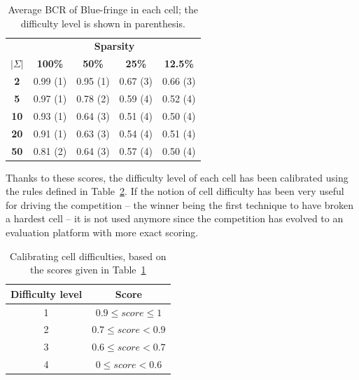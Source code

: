 \begin{table}
\begin{center}
\begin{tabular}{c|c c c c}
&\multicolumn{4}{|c}{\textbf{Sparsity}}\\ 
\textbf{$|\Sigma|$} & \textbf{100\%} & \textbf{50\%} & \textbf{25\%} & \textbf{12.5\%}\\
\hline
\textbf{2}  & 0.99 (1) & 0.95 (1) & 0.67 (3) & 0.66 (3)\\
\textbf{5}  & 0.97 (1) & 0.78 (2) & 0.59 (4) & 0.52 (4)\\
\textbf{10} & 0.93 (1) & 0.64 (3) & 0.51 (4) & 0.50 (4)\\
\textbf{20} & 0.91 (1) & 0.63 (3) & 0.54 (4) & 0.51 (4)\\
\textbf{50} & 0.81 (2) & 0.64 (3) & 0.57 (4) & 0.50 (4)\\
\end{tabular}
\end{center}
\caption{Average BCR of Blue-fringe in each cell; the difficulty level is shown in parenthesis.\label{table:stamina-baseline}}
\end{table}

Thanks to these scores, the difficulty level of each cell has been calibrated using the rules defined in Table~\ref{stamina:table:calibration}. If the notion of cell difficulty has been very useful for driving the competition -- the winner being the first technique to have broken a hardest cell -- it is not used anymore since the competition has evolved to an evaluation platform with more exact scoring.

\begin{table}
\begin{center}
\begin{tabular}{c|c}
Difficulty level & Score\\
\hline
1&$0.9 \leq score \leq 1$\\
2&$0.7 \leq score < 0.9$\\
3&$0.6 \leq score < 0.7$\\
4&$0 \leq score < 0.6$\\
\end{tabular}
\end{center}
\caption{\label{stamina:table:calibration}Calibrating cell difficulties, based on the scores given in Table~\ref{table:stamina-baseline}}
\end{table}

